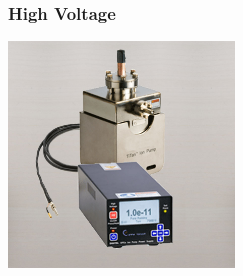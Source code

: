 \documentclass{beamer}
\begin{document}
\begin{frame}\frametitle{High Voltage}
\begin{center}
\includegraphics[width=6cm]{fig/highV.jpg}
\end{center}
\end{frame}
\end{document}

